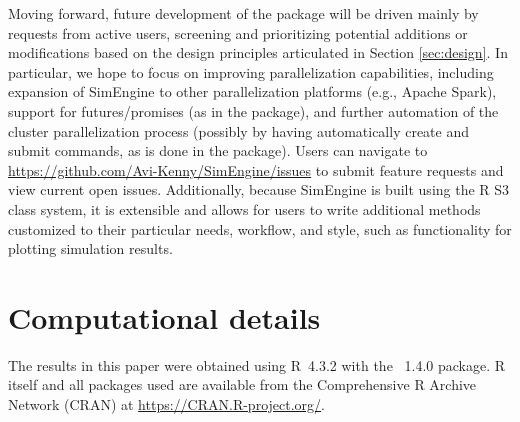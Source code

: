 Moving forward, future development of the package will be driven mainly by requests from active users, screening and prioritizing potential additions or modifications based on the design principles articulated in Section \ref{sec:design}. In particular, we hope to focus on improving parallelization capabilities, including expansion of SimEngine to other parallelization platforms (e.g., Apache Spark), support for futures/promises (as in the  package), and further automation of the cluster parallelization process (possibly by having  automatically create and submit  commands, as is done in the  package). Users can navigate to \url{https://github.com/Avi-Kenny/SimEngine/issues} to submit feature requests and view current open issues. Additionally, because SimEngine is built using the R S3 class system, it is extensible and allows for users to write additional methods customized to their particular needs, workflow, and style, such as functionality for plotting simulation results.

\section*{Computational details}

The results in this paper were obtained using R~4.3.2 with the ~1.4.0 package. R itself and all packages used are available from the Comprehensive R Archive Network (CRAN) at \url{https://CRAN.R-project.org/}.



\address{Avi Kenny\\
  Department of Biostatistics and Bioinformatics, Duke University\\
  Global Health Institute, Duke University\\
  2424 Erwin Rd\\
  Durham, NC 27710, USA\\
  ORCiD: 0000-0002-9465-7307\\
  }

\address{Charles J. Wolock\\
  Department of Biostatistics, Epidemiology and Informatics\\
  University of Pennsylvania\\
  423 Guardian Drive\\
  Philadelphia, PA 19104, USA\\
  ORCiD: 0000-0003-3527-1102\\
  }

